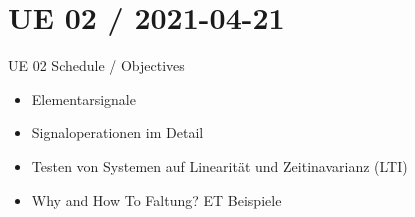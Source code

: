 \documentclass[mathserif, aspectratio=43]{intbeamer}
\begin{document}
\section{UE 02 / 2021-04-21}
\begin{frame}{UE 02 Schedule / Objectives}

\begin{itemize}
\item Elementarsignale
\item Signaloperationen im Detail
\item Testen von Systemen auf Linearität und Zeitinavarianz (LTI)
\item Why and How To Faltung? ET Beispiele
\end{itemize}

\end{frame}
\end{document}
